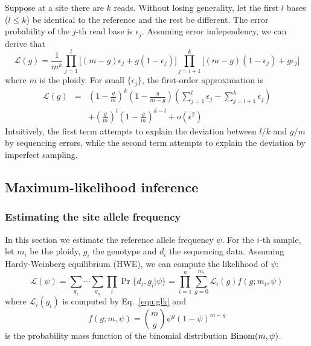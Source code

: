 \documentclass{bioinfo}
\begin{document}
\begin{methods}
Suppose at a site there are $k$ reads. Without losing generality, let the first
$l$ bases ($l\le k$) be identical to the reference and the rest be different.
The error probability of the $j$-th read base is $\epsilon_j$.  Assuming error
independency, we can derive that
\begin{equation}\label{equ:glk}
\mathcal{L}(g)=\frac{1}{m^k}\prod_{j=1}^l\Big[(m-g)\epsilon_j+g(1-\epsilon_j)\Big]\prod_{j=l+1}^k\Big[(m-g)(1-\epsilon_j)+g\epsilon_j\Big]
\end{equation}
where $m$ is the ploidy. For small $\{\epsilon_j\}$, the first-order
approximation is
\begin{eqnarray*}
\mathcal{L}(g)&=&\left(1-\frac{g}{m}\right)^k\left(1-\frac{g}{m-g}\right)\left(\sum_{j=1}^l\epsilon_j-\sum_{j=l+1}^k\epsilon_j\right)\\
&&+\left(\frac{g}{m}\right)^l\left(1-\frac{g}{m}\right)^{k-l}+o(\epsilon^2)
\end{eqnarray*}
Intuitively, the first term attempts to explain the deviation between $l/k$ and
$g/m$ by sequencing errors, while the second term attempts to explain the
deviation by imperfect sampling.


\subsection{Maximum-likelihood inference}

\subsubsection{Estimating the site allele frequency}
In this section we estimate the reference allele frequency $\psi$.  For the
$i$-th sample, let $m_i$ be the ploidy, $g_i$ the genotype and $d_i$ the
sequencing data.  Assuming Hardy-Weinberg equilibrium (HWE), we can compute the
likelihood of $\psi$:
\begin{equation}\label{equ:flk}
\mathcal{L}(\psi)=\sum_{g_1}\cdots\sum_{g_n}\prod_i\Pr\{d_i,g_i|\psi\}=\prod_{i=1}^n\sum_{g=0}^{m_i}\mathcal{L}_i(g)f(g;m_i,\psi)
\end{equation}
where $\mathcal{L}_i(g_i)$ is computed by Eq.~\eqref{equ:glk} and
\begin{equation}
f(g;m,\psi)=\binom{m}{g}\psi^g(1-\psi)^{m-g}
\end{equation}
is the probability mass function of the binomial distribution ${\rm
Binom}(m,\psi)$.


\end{methods}
\end{document}
